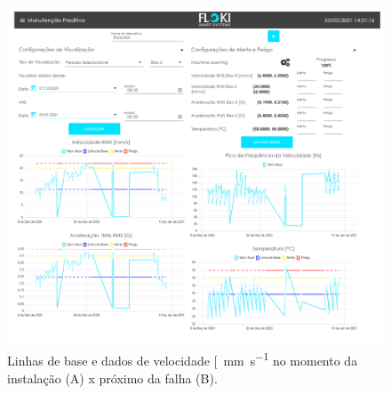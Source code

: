 \begin{figure}[H]
    \caption{Linhas de base e dados de velocidade [\SI{}{\milli\metre\per\second} no momento da instalação
    (A) x próximo da falha (B).}
    \begin{center}
        \includegraphics[scale=0.65, page=5]{resultados/img/resultados.pdf}
    \end{center}
    \label{fig:seleira_universal_antes_depois}
\end{figure}

